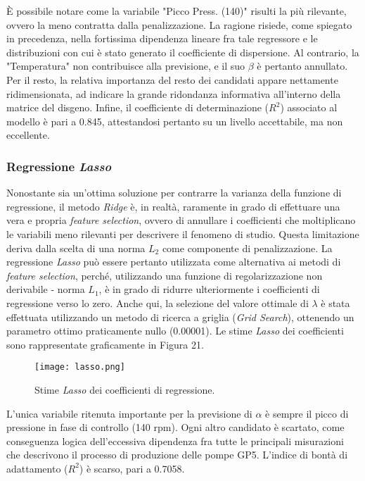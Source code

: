 \documentclass[fleqn,10pt]{SelfArx} %
\begin{document}
È possibile notare come la variabile "Picco Press. (140)" risulti la più rilevante, ovvero la meno contratta dalla penalizzazione. La ragione risiede, come spiegato in precedenza, nella fortissima dipendenza lineare fra tale regressore e le distribuzioni con cui è stato generato il coefficiente di dispersione. Al contrario, la "Temperatura" non contribuisce alla previsione, e il suo $\beta$ è pertanto annullato. Per il resto, la relativa importanza del resto dei candidati appare nettamente ridimensionata, ad indicare la grande ridondanza informativa all'interno della matrice del disgeno. Infine, il coefficiente di determinazione ($R^2$) associato al modello è pari a 0.845, attestandosi pertanto su un livello accettabile, ma non eccellente.
\subsubsection{Regressione \textit{Lasso}}
Nonostante sia un'ottima soluzione per contrarre la varianza della funzione di regressione, il metodo \textit{Ridge} è, in realtà, raramente in grado di effettuare una vera e propria \textit{feature selection}, ovvero di annullare i coefficienti che moltiplicano le variabili meno rilevanti per descrivere il fenomeno di studio. Questa limitazione deriva dalla scelta di una norma $L_2$ come componente di penalizzazione. La regressione \textit{Lasso} può essere pertanto utilizzata come alternativa ai metodi di \textit{feature selection}, perché, utilizzando una funzione di regolarizzazione non derivabile - norma $L_1$, è in grado di ridurre ulteriormente i coefficienti di regressione verso lo zero. Anche qui, la selezione del valore ottimale di $\lambda$ è stata effettuata utilizzando un metodo di ricerca a griglia (\textit{Grid Search}), ottenendo un parametro ottimo praticamente nullo (0.00001). Le stime \textit{Lasso} dei coefficienti sono rappresentate graficamente in Figura 21.
\begin{figure}[h]
    \centering
    \texttt{[image: lasso.png]}
    \label{fig:em}
    \caption{Stime \textit{Lasso} dei coefficienti di regressione.}
\end{figure}
L'unica variabile ritenuta importante per la previsione di $\alpha$ è sempre il picco di pressione in fase di controllo (140 rpm). Ogni altro candidato è scartato, come conseguenza logica dell'eccessiva dipendenza fra tutte le principali misurazioni che descrivono il processo di produzione delle pompe GP5. L'indice di bontà di adattamento ($R^2$) è scarso, pari a 0.7058.
\end{document}
